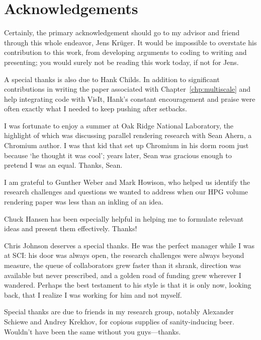 \section*{Acknowledgements}

Certainly, the primary acknowledgement should go to my advisor and
friend through this whole endeavor, Jens Kr\"uger.  It would be
impossible to overstate his contribution to this work, from developing
arguments to coding to writing and presenting; you would surely not be
reading this work today, if not for Jens.

A special thanks is also due to Hank Childs.  In addition to
significant contributions in writing the paper associated with
Chapter~\ref{chp:multiscale} and help integrating code with VisIt,
Hank's constant encouragement and praise were often exactly what I
needed to keep pushing after setbacks.

I was fortunate to enjoy a summer at Oak Ridge National Laboratory, the
highlight of which was discussing parallel rendering research with Sean
Ahern, a Chromium author.  I was that kid that set up Chromium in his
dorm room just because `he thought it was cool'; years later, Sean was
gracious enough to pretend I was an equal.  Thanks, Sean.

I am grateful to Gunther Weber and Mark Howison, who helped us identify
the research challenges and questions we wanted to address when our HPG
volume rendering paper was less than an inkling of an idea.

Chuck Hansen has been especially helpful in helping me to formulate
relevant ideas and present them effectively.  Thanks!


Chris Johnson deserves a special thanks.  He was the perfect manager
while I was at SCI: his door was always open, the research challenges
were always beyond measure, the queue of collaborators grew faster than
it shrank, direction was available but never prescribed, and a golden
road of funding grew wherever I wandered.  Perhaps the best testament
to his style is that it is only now, looking back, that I realize I was
working for him and not myself.

Special thanks are due to friends in my research group, notably
Alexander Schiewe and Andrey Krekhov, for copious supplies of
sanity-inducing beer.  Wouldn't have been the same without you
guys---thanks.

